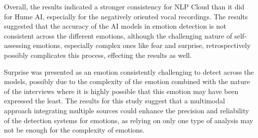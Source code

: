 Overall, the results indicated a stronger consistency for NLP Cloud than it did for Hume AI, especially for the negatively oriented vocal recordings. The results suggested that the accuracy of the AI models in emotion detection is not consistent across the different emotions, although the challenging nature of self-assessing emotions, especially complex ones like fear and surprise, retrospectively possibly complicates this process, effecting the results as well.

Surprise was presented as an emotion consistently challenging to detect across the models, possibly due to the complexity of the emotion combined with the nature of the interviews where it is highly possible that this emotion may have been expressed the least.
The results for this study suggest that a multimodal approach integrating multiple sources could enhance the precision and reliability of the detection systems for emotions, as relying on only one type of analysis may not be enough for the complexity of emotions.
